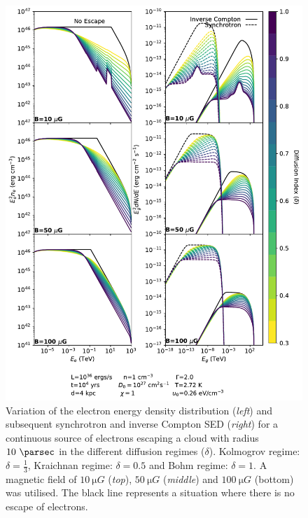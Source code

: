 \begin{figure}[hbtp]
    \centering
    \includegraphics[width=1.0\textwidth]{07_Particle_Evolution/Images/Code/diffusion_regimes_continuous.pdf}
    \caption{Variation of the electron energy density distribution (\textit{left}) and subsequent synchrotron and inverse Compton SED (\textit{right}) for a continuous source of electrons escaping a cloud with radius $10~\pc$ in the different diffusion regimes ($\delta$). Kolmogrov regime: $\delta=\frac{1}{3}$, Kraichnan regime: $\delta=0.5$ and Bohm regime: $\delta=1$. A magnetic field of $10~\si{\micro G}$ (\textit{top}), $50~\si{\micro G}$ (\textit{middle}) and $100~\si{\micro G}$ (bottom) was utilised. The black line represents a situation where there is no escape of electrons.}
    \label{fig:chapter_7_newsedprod_diffusion_regimes_continuous}
\end{figure}

